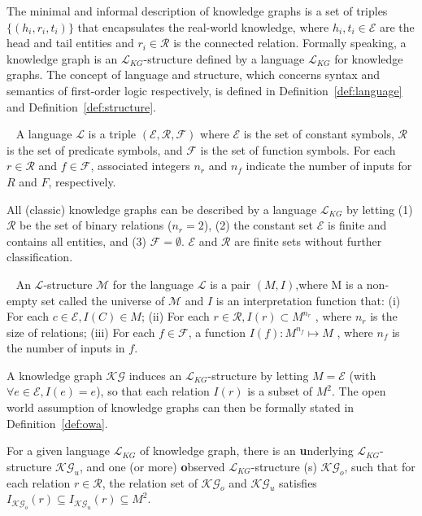 \documentclass[11pt]{article}
\newcommand{\entity}{\mathcal{E}}
\newcommand{\relation}{\mathcal{R}}
\newcommand{\lang}{\mathcal{L}}
\newcommand{\model}{\mathcal{M}}
\newcommand{\kg}{\mathcal{KG}}
\begin{document}
The minimal and informal description of knowledge graphs is a set of triples $\{(h_i, r_i, t_i)\}$ that encapsulates the real-world knowledge, where $h_i, t_i\in \entity$ are the head and tail entities and $r_i\in \relation$ is the connected relation. Formally speaking, a knowledge graph is an $\lang_{KG}$-structure defined by a language $\lang_{KG}$ for knowledge graphs. The concept of language and structure, which concerns syntax and semantics of first-order logic respectively, is defined in Definition~\ref{def:language} and Definition~\ref{def:structure}.

\begin{definition}[Language]~\label{def:language}
    A language $\lang$ is a triple $(\entity, \relation, \mathcal{F})$ where $\entity$ is the set of constant symbols, $\relation$ is the set of predicate symbols, and $\mathcal{F}$ is the set of function symbols. For each $r\in \relation$ and $f\in \mathcal{F}$, associated integers $n_r$ and $n_f$ indicate the number of inputs for $R$ and $F$, respectively.
\end{definition}
All (classic) knowledge graphs can be described by a language $\lang_{KG}$ by letting (1) $\relation$ be the set of binary relations ($n_r=2$), (2) the constant set $\entity$ is finite and contains all entities, and (3) $\mathcal{F} = \emptyset$. $\entity$ and $\relation$ are finite sets without further classification.


\begin{definition}[$\lang$-structure]~\label{def:structure}
    An $\lang$-structure $\model$ for the language $\lang$ is a pair $(M,I)$,where M is a non-empty set called the universe of $\model$ and $I$ is an interpretation function that:
    (i) For each $c\in \entity, I(C)\in M$; 
    (ii)  For each $r\in \relation, I(r) \subset M^{n_r}$ , where $n_r$ is the size of relations;
    (iii) For each $f\in \mathcal{F}$, a function $I(f): M^{n_f}\mapsto M$ , where $n_f$ is the number of inputs in $f$.
\end{definition}

A knowledge graph  $\kg$ induces an $\lang_{KG}$-structure by letting $M = \entity$ (with $\forall e\in \entity, I(e) = e$), so that each relation $I(r)$ is a subset of $M^2$.
The open world assumption of knowledge graphs can then be formally stated in Definition~\ref{def:owa}.
\begin{definition}\label{def:owa}
For a given language $\lang_{KG}$ of knowledge graph, there is an \textbf{u}nderlying $\lang_{KG}$-structure $\kg_u$, and one (or more) \textbf{o}bserved $\lang_{KG}$-structure (s) $\kg_o$, such that for each relation $r\in \relation$, the relation set of $\kg_o$ and $\kg_u$ satisfies $I_{\kg_o}(r) \subseteq I_{\kg_u}(r) \subseteq M^2$.
\end{definition}
\end{document}
